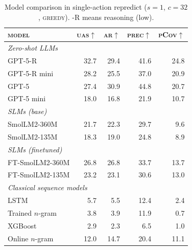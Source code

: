 \documentclass{article}
\theoremstyle{plain}
\theoremstyle{definition}
\theoremstyle{remark}
\begin{document}
\begin{table}[t]
  \caption{Model comparison in single-action repredict ($s{=}1$, $c{=}32$, \textsc{greedy}). -R means reasoning (low).}
  \label{tab:models-repredict}
  \centering
  \small
  \begin{tabular}{lrrrr}
    \toprule
    \textsc{model} & \textsc{uas}$\uparrow$ & \textsc{ar}$\uparrow$ & \textsc{prec}$\uparrow$ & \textsc{pCov}$\uparrow$ \\
    \midrule
    \multicolumn{5}{l}{\itshape Zero-shot LLMs} \\
    GPT-5-R      & 32.7 & 29.4 & 41.6 & 24.8 \\
    GPT-5-R mini & 28.2 & 25.5 & 37.0 & 20.9 \\
    GPT-5         & 27.4 & 30.9 & 44.8 & 20.7 \\
    GPT-5 mini    & 18.0 & 16.8 & 21.9 & 10.7 \\
    \midrule
    \multicolumn{5}{l}{\itshape SLMs (base)} \\
    SmolLM2-360M         & 21.7 & 22.3 & 29.7 &  9.6 \\
    SmolLM2-135M         & 18.3 & 19.0 & 24.8 &  8.9 \\
    \multicolumn{5}{l}{\itshape SLMs (finetuned)} \\
    FT-SmolLM2-360M      & 26.8 & 26.8 & 33.7 & 13.7 \\
    FT-SmolLM2-135M      & 23.2 & 23.1 & 30.6 & 13.0 \\
    \midrule
    \multicolumn{5}{l}{\itshape Classical sequence models} \\
    LSTM                 &  5.7 &  5.5 & 12.4 &  2.4 \\
    Trained $n$-gram       &  3.8 &  3.9 & 11.9 &  0.7 \\
    XGBoost              &  2.9 &  2.3 &  6.5 &  1.0 \\
    Online $n$-gram        & 12.0 & 14.7 & 20.4 & 11.1 \\
    \bottomrule
  \end{tabular}
\end{table}
\end{document}

